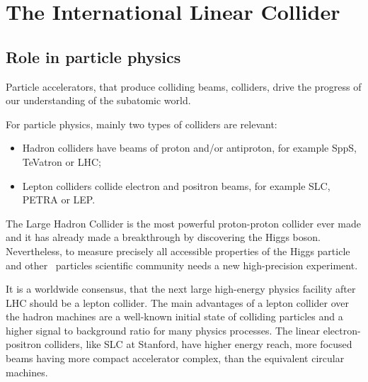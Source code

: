 
\section{The International Linear Collider}
\label{sec:ILC}
\subsection{Role in particle physics}
Particle accelerators, that produce colliding beams, colliders, drive the progress of our understanding of the subatomic world.

For particle physics, mainly two types of colliders are relevant:
\begin{itemize}
\item Hadron colliders have beams of proton and/or antiproton, for example SppS, TeVatron or LHC;
\item Lepton colliders collide electron and positron beams, for example SLC, PETRA or LEP.
\end{itemize}


The Large Hadron Collider is the most powerful proton-proton collider ever made and it has already made a breakthrough by discovering the Higgs boson.  Nevertheless, to measure precisely all accessible properties of the Higgs particle and other \sm\ particles scientific community needs a new high-precision experiment.

It is a worldwide consensus, that the next large high-energy physics facility after LHC should be a lepton collider. 
The main advantages of a lepton collider over the hadron machines are a well-known initial state of colliding particles and a higher signal to background ratio for many physics processes.
The linear electron-positron colliders, like SLC at Stanford, have higher energy reach, more focused beams having more compact accelerator complex, than the equivalent circular machines.

